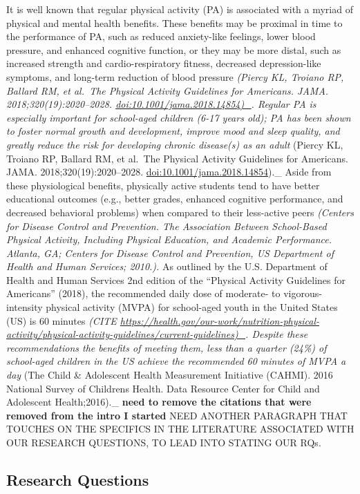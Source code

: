 \documentclass[
]{article}
\begin{document}
It is well known that regular physical activity (PA) is associated with
a myriad of physical and mental health benefits. These benefits may be
proximal in time to the performance of PA, such as reduced anxiety-like
feelings, lower blood pressure, and enhanced cognitive function, or they
may be more distal, such as increased strength and cardio-respiratory
fitness, decreased depression-like symptoms, and long-term reduction of
blood pressure \emph{(Piercy KL, Troiano RP, Ballard RM, et al.~The
Physical Activity Guidelines for Americans. JAMA.
2018;320(19):2020--2028. \url{doi:10.1001/jama.2018.14854)_}. Regular PA
is especially important for school-aged children (6-17 years old); PA
has been shown to foster normal growth and development, improve mood and
sleep quality, and greatly reduce the risk for developing chronic
disease(s) as an adult }(Piercy KL, Troiano RP, Ballard RM, et al.~The
Physical Activity Guidelines for Americans. JAMA.
2018;320(19):2020--2028. \url{doi:10.1001/jama.2018.14854}).\_ Aside
from these physiological benefits, physically active students tend to
have better educational outcomes (e.g., better grades, enhanced
cognitive performance, and decreased behavioral problems) when compared
to their less-active peers \emph{(Centers for Disease Control and
Prevention. The Association Between School-Based Physical Activity,
Including Physical Education, and Academic Performance. Atlanta, GA;
Centers for Disease Control and Prevention, US Department of Health and
Human Services; 2010.).} As outlined by the U.S. Department of Health
and Human Services 2nd edition of the ``Physical Activity Guidelines for
Americans'' (2018), the recommended daily dose of moderate- to
vigorous-intensity physical activity (MVPA) for school-aged youth in the
United States (US) is 60 minutes \emph{(CITE
\url{https://health.gov/our-work/nutrition-physical-activity/physical-activity-guidelines/current-guidelines)_}.
Despite these recommendations the benefits of meeting them, less than a
quarter (24\%) of school-aged children in the US achieve the recommended
60 minutes of MVPA a day }(The Child \& Adolescent Health Measurement
Initiative (CAHMI). 2016 National Survey of Childrens Health. Data
Resource Center for Child and Adolescent Health;2016).\_ \textbf{need to
remove the citations that were removed from the intro I started} NEED
ANOTHER PARAGRAPH THAT TOUCHES ON THE SPECIFICS IN THE LITERATURE
ASSOCIATED WITH OUR RESEARCH QUESTIONS, TO LEAD INTO STATING OUR RQs.

\hypertarget{research-questions}{%
\subsection{Research Questions}\label{research-questions}}
\end{document}

